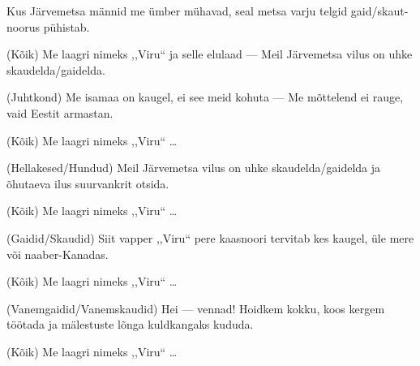 Kus J\"arvemetsa m\"annid
me \"umber m\"uhavad,
seal metsa varju telgid
gaid/skaut-noorus p\"uhistab.

(K\~oik)
Me laagri nimeks ,,Viru{``}
ja selle elulaad ---
Meil J\"arvemetsa vilus
on uhke skaudelda/gaidelda.

(Juhtkond)
Me isamaa on kaugel,
ei see meid kohuta ---
Me m\~ottelend ei rauge,
vaid Eestit armastan.

(K\~oik) Me laagri nimeks ,,Viru{``} \ldots

(Hellakesed/Hundud)
Meil J\"arvemetsa vilus
on uhke skaudelda/gaidelda
ja \~ohutaeva ilus
suurvankrit otsida.

(K\~oik) Me laagri nimeks ,,Viru{``} \ldots

(Gaidid/Skaudid)
Siit vapper ,,Viru{``} pere
kaasnoori tervitab
kes kaugel, \"ule mere
v\~oi naaber-Kanadas.

(K\~oik) Me laagri nimeks ,,Viru{``} \ldots

(Vanemgaidid/Vanemskaudid)
Hei --- vennad! Hoidkem kokku,
koos kergem t\"o\"otada
ja m\"alestuste l\~onga
kuldkangaks kududa.

(K\~oik) Me laagri nimeks ,,Viru{``} \ldots